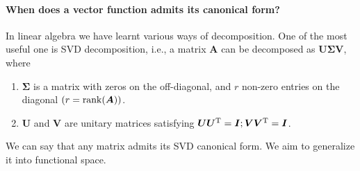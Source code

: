 \paragraph{
When does a vector function admits its canonical form?
}
In linear algebra we have learnt various ways of decomposition. One of the most useful one is SVD decomposition, i.e., a matrix $\bm A$ can be decomposed as $\bm U\bm\Sigma\bm V$, where 
\begin{enumerate}
\item
$\bm\Sigma$ is a matrix with zeros on the off-diagonal, and $r$ non-zero entries on the diagonal $(r=\operatorname{rank}(\bm A))$. 
\item
$\bm U$ and $\bm V$ are unitary matrices satisfying $\bm U\bm U^{\mathrm T}=\bm I;\bm V\bm V^{\mathrm T}=\bm I$.
\end{enumerate}
We can say that any matrix admits its SVD canonical form. We aim to generalize it into functional space.

